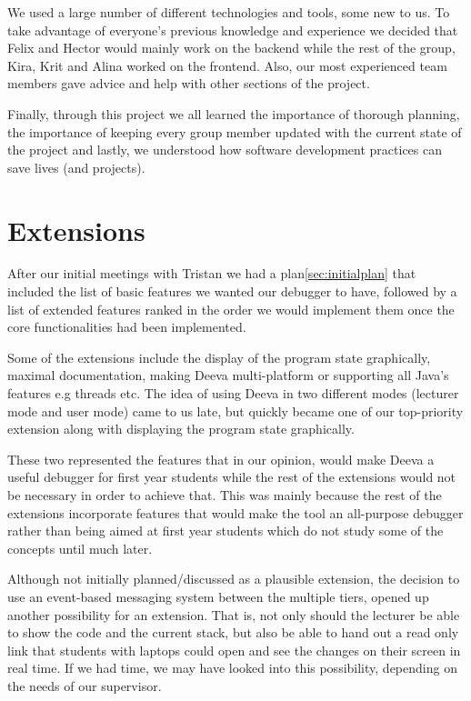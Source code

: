 \documentclass[11pt, a4paper]{article}
\begin{document}
We used a large number of different technologies and tools, some new to us.
To take advantage of everyone's previous knowledge and experience we decided that Felix and Hector would mainly work on the backend while the rest of the group, Kira, Krit and Alina worked on the frontend.
Also, our most experienced team members gave advice and help with other sections of the project.

Finally, through this project we all learned the importance of thorough planning, the importance of keeping every group member updated with the current state of the project and lastly, we understood how software development practices can save lives (and projects).

\section{Extensions}
After our initial meetings with Tristan we had a plan\ref{sec:initialplan} that included the list of basic features we wanted our debugger to have, followed by a list of extended features ranked in the order we would implement them once the core functionalities had been implemented.

Some of the extensions include the display of the program state graphically, maximal documentation, making Deeva multi-platform or supporting all Java's features e.g threads etc.
The idea of using Deeva in two different modes (lecturer mode and user mode) came to us late, but quickly became one of our top-priority extension along with displaying the program state graphically.

These two represented the features that in our opinion, would make Deeva a useful debugger for first year students while the rest of the extensions would not be necessary in order to achieve that.
This was  mainly because the rest of the extensions incorporate features that would make the tool an all-purpose debugger rather than being aimed at first year students which do not study some of the concepts until much later.

Although not initially planned/discussed as a plausible extension, the decision to use an event-based messaging system between the multiple tiers, opened up another possibility for an extension.
That is, not only should the lecturer be able to show the code and the current stack, but also be able to hand out a read only link that students with laptops could open and see the changes on their screen in real time.
If we had time, we may have looked into this possibility, depending on the needs of our supervisor.
\end{document}
